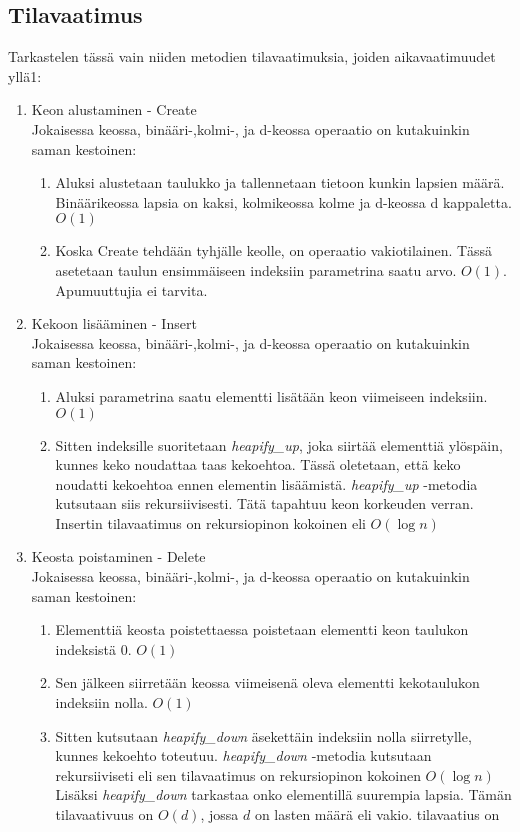 \documentclass[a4paper,12pt]{article}
\begin{document}
\subsection{Tilavaatimus}
Tarkastelen tässä vain niiden metodien tilavaatimuksia, joiden aikavaatimuudet yllä1:
\begin{enumerate}
\item Keon alustaminen - Create\\
Jokaisessa keossa, binääri-,kolmi-, ja d-keossa operaatio on kutakuinkin saman kestoinen:
\begin{enumerate}
\item Aluksi alustetaan taulukko ja tallennetaan tietoon kunkin lapsien määrä.
Binäärikeossa lapsia on kaksi, kolmikeossa kolme ja d-keossa d kappaletta. $O(1)$
\item Koska Create tehdään tyhjälle keolle, on operaatio vakiotilainen. Tässä asetetaan taulun ensimmäiseen indeksiin parametrina saatu arvo. $O(1)$. Apumuuttujia ei tarvita.
\end{enumerate}
\item Kekoon lisääminen - Insert\\
Jokaisessa keossa, binääri-,kolmi-, ja d-keossa operaatio on kutakuinkin saman kestoinen:
\begin{enumerate}
\item Aluksi parametrina saatu elementti lisätään keon viimeiseen indeksiin.$O(1)$
\item Sitten indeksille suoritetaan \emph{heapify\_up}, joka siirtää elementtiä ylöspäin, kunnes keko noudattaa taas kekoehtoa. Tässä oletetaan, että keko noudatti kekoehtoa ennen elementin lisäämistä. \emph{heapify\_up} -metodia kutsutaan siis rekursiivisesti.
Tätä tapahtuu keon korkeuden verran. Insertin tilavaatimus on rekursiopinon kokoinen eli $O(\log n)$
\end{enumerate}
\item Keosta poistaminen - Delete\\
Jokaisessa keossa, binääri-,kolmi-, ja d-keossa operaatio on kutakuinkin saman kestoinen:
\begin{enumerate}
\item Elementtiä keosta poistettaessa poistetaan elementti keon taulukon indeksistä 0. $O(1)$
\item Sen jälkeen siirretään keossa viimeisenä oleva elementti kekotaulukon indeksiin nolla. $O(1)$
\item Sitten kutsutaan \emph{heapify\_down} äsekettäin indeksiin nolla siirretylle, kunnes kekoehto toteutuu. \emph{heapify\_down} -metodia kutsutaan rekursiiviseti eli sen tilavaatimus on rekursiopinon kokoinen $O(\log n)$ Lisäksi \emph{heapify\_down} tarkastaa onko elementillä suurempia lapsia. Tämän tilavaativuus on $O(d)$, jossa $d$ on lasten määrä eli vakio. tilavaatius on
\end{enumerate}
\end{enumerate}
\end{document}
